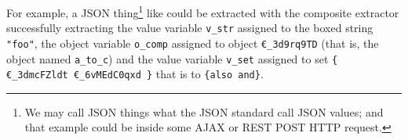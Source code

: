 For example, a JSON thing\footnote{We may call JSON things what the
  JSON standard call JSON values; and that example could be inside
  some AJAX or REST POST HTTP request.} like {} could be extracted with the composite extractor
{} successfully extracting
the value variable \texttt{v\_str} assigned to the boxed string
\texttt{"foo"}, the object variable \texttt{o\_comp} assigned to
object \texttt{€\_3d9rq9TD} (that is, the object named
\texttt{a\_to\_c}) and the value variable \texttt{v\_set} assigned to
set \texttt{\{ €\_3dmcFZldt €\_6vMEdC0qxd \}} that is to
\texttt{\{also and\}}.


